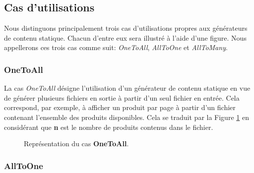 	\subsection{Cas d'utilisations}
	
		Nous distinguons principalement trois cas d'utilisations propres aux générateurs de contenu statique. Chacun d'entre eux sera illustré à l'aide d'une figure. Nous appellerons ces trois cas comme suit: \textit{OneToAll}, \textit{AllToOne} et \textit{AllToMany}.\\
		
		\subsubsection*{OneToAll}
		
			La cas \textit{OneToAll} désigne l'utilisation d'un générateur de contenu statique en vue de générer plusieurs fichiers en sortie à partir d'un seul fichier en entrée. Cela correspond, par exemple, à afficher un produit par page à partir d'un fichier contenant l'ensemble des produits disponibles. Cela se traduit par la Figure \ref{fig:OneToAll} en considérant que \textbf{n} est le nombre de produits contenus dans le fichier.
			
			\begin{figure}
				\begin{center}
					\caption{Représentation du cas \textbf{OneToAll}.}
					\label{fig:OneToAll}
				\end{center}
			\end{figure}
		
		\subsubsection*{AllToOne}
		
